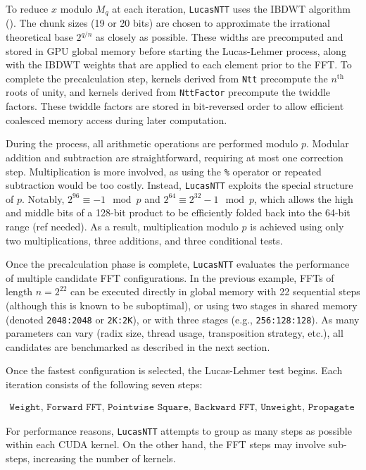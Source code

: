 \documentclass{article}
\begin{document}
To reduce $x$ modulo $M_q$ at each iteration, \texttt{LucasNTT} uses the IBDWT algorithm (\cite{CF94}). The chunk sizes (19 or 20 bits) are chosen to approximate the irrational theoretical base
$2^{q/n}$
as closely as possible. These widths are precomputed and stored in GPU global memory before starting the Lucas-Lehmer process, along with the IBDWT weights that are applied to each element prior to the FFT. To complete the precalculation step, kernels derived from \texttt{Ntt} precompute the $n^\text{th}$ roots of unity, and kernels derived from \texttt{NttFactor} precompute the twiddle factors. These twiddle factors are stored in bit-reversed order to allow efficient coalesced memory access during later computation.

During the process, all arithmetic operations are performed modulo $p$. Modular addition and subtraction are straightforward, requiring at most one correction step. Multiplication is more involved, as using the \texttt{\%} operator or repeated subtraction would be too costly. Instead, \texttt{LucasNTT} exploits the special structure of $p$. Notably,
$2^{96} \equiv -1 \mod p$
and
$2^{64} \equiv 2^{32} - 1 \mod p$,
which allows the high and middle bits of a 128-bit product to be efficiently folded back into the 64-bit range (ref needed). As a result, multiplication modulo $p$ is achieved using only two multiplications, three additions, and three conditional tests.

Once the precalculation phase is complete, \texttt{LucasNTT} evaluates the performance of multiple candidate FFT configurations. In the previous example, FFTs of length $n = 2^{22}$ can be executed directly in global memory with 22 sequential steps (although this is known to be suboptimal), or using two stages in shared memory (denoted \texttt{2048:2048} or \texttt{2K:2K}), or with three stages (e.g., \texttt{256:128:128}). As many parameters can vary (radix size, thread usage, transposition strategy, etc.), all candidates are benchmarked as described in the next section.

Once the fastest configuration is selected, the Lucas-Lehmer test begins. Each iteration consists of the following seven steps:

\begin{align*}
\texttt{Weight, Forward FFT, Pointwise Square, Backward FFT, Unweight, Propagate carry, Minus 2}
\end{align*}

For performance reasons, \texttt{LucasNTT} attempts to group as many steps as possible within each CUDA kernel. On the other hand, the FFT steps may involve sub-steps, increasing the number of kernels.
\end{document}
